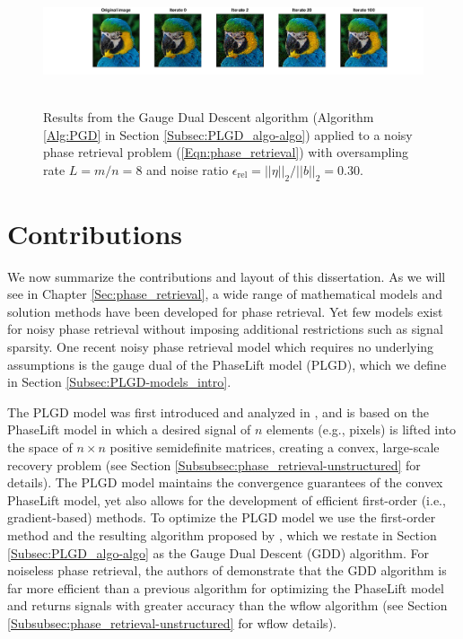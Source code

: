 \begin{figure}[H]
\centering
\hbox{\hspace{-2.55cm} \includegraphics[scale=0.6]{parrot_signal_iterates} }
\caption{Results from the Gauge Dual Descent algorithm (Algorithm \ref{Alg:PGD} in Section \ref{Subsec:PLGD_algo-algo}) applied to a noisy phase retrieval problem (\ref{Eqn:phase_retrieval}) with oversampling rate $L = m/n=8$ and noise ratio $\epsilon_\text{rel} = ||\eta||_2 / ||b||_2 = 0.30$.}
\label{Fig:parrot_signal_iterates}
\end{figure}






\section{Contributions}		\label{Subsec:Intro-contributions}


We now summarize the contributions and layout of this dissertation.
As we will see in Chapter \ref{Sec:phase_retrieval}, a wide range of mathematical models and solution methods have been developed for phase retrieval.
Yet few models exist for noisy phase retrieval without imposing additional restrictions such as signal sparsity.  
One recent noisy phase retrieval model which requires no underlying assumptions is the gauge dual of the PhaseLift model (PLGD), which we define in Section \ref{Subsec:PLGD-models_intro}.



The PLGD model was first introduced and analyzed in \cite{DBLP:journals/siamsc/FriedlanderM16}, and is based on the PhaseLift model \cite{DBLP:journals/siamis/CandesESV13} in which a desired signal of $n$ elements (e.g., pixels) is lifted into the space of $n \times n$ positive semidefinite matrices, creating a convex, large-scale recovery problem (see Section \ref{Subsubsec:phase_retrieval-unstructured} for details).  
The PLGD model maintains the convergence guarantees of the convex PhaseLift model, yet also allows for the development of efficient first-order (i.e., gradient-based) methods.
To optimize the PLGD model we use the first-order method and the resulting algorithm proposed by \cite{DBLP:journals/siamsc/FriedlanderM16}, which we restate in Section \ref{Subsec:PLGD_algo-algo} as the Gauge Dual Descent (GDD) algorithm.
For noiseless phase retrieval, the authors of \cite{DBLP:journals/siamsc/FriedlanderM16} demonstrate that the GDD algorithm is far more efficient than a previous algorithm for optimizing the PhaseLift model and returns signals with greater accuracy than the wflow algorithm \cite{DBLP:journals/tit/CandesLS15} (see Section \ref{Subsubsec:phase_retrieval-unstructured} for wflow details).  


